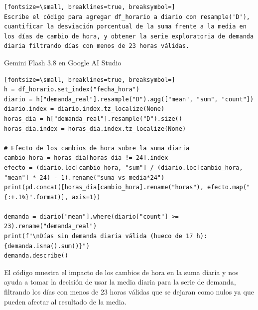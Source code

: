 \documentclass[12pt,a4paper,oneside]{book}
\begin{document}
\begin{iaprompt}
\begin{Verbatim}[fontsize=\small, breaklines=true, breaksymbol=]
Escribe el código para agregar df_horario a diario con resample('D'), cuantificar la desviación porcentual de la suma frente a la media en los días de cambio de hora, y obtener la serie exploratoria de demanda diaria filtrando días con menos de 23 horas válidas.
\end{Verbatim}
\end{iaprompt}
\begin{iaresp}{Gemini Flash 3.8 en Google AI Studio}
\begin{Verbatim}[fontsize=\small, breaklines=true, breaksymbol=]
h = df_horario.set_index("fecha_hora")
diario = h["demanda_real"].resample("D").agg(["mean", "sum", "count"])
diario.index = diario.index.tz_localize(None)
horas_dia = h["demanda_real"].resample("D").size()
horas_dia.index = horas_dia.index.tz_localize(None)

# Efecto de los cambios de hora sobre la suma diaria
cambio_hora = horas_dia[horas_dia != 24].index
efecto = (diario.loc[cambio_hora, "sum"] / (diario.loc[cambio_hora, "mean"] * 24) - 1).rename("suma vs media*24")
print(pd.concat([horas_dia[cambio_hora].rename("horas"), efecto.map("{:+.1%}".format)], axis=1))

demanda = diario["mean"].where(diario["count"] >= 23).rename("demanda_real")
print(f"\nDías sin demanda diaria válida (hueco de 17 h): {demanda.isna().sum()}")
demanda.describe()
\end{Verbatim}
\end{iaresp}
\begin{iaanalisis}
El código muestra el impacto de los cambios de hora en la suma diaria y nos ayuda a tomar la decisión de usar la media diaria para la serie de demanda, filtrando los días con menos de 23 horas válidas que se dejaran como nulos ya que pueden afectar al resultado de la media.
\end{iaanalisis}
\end{document}
